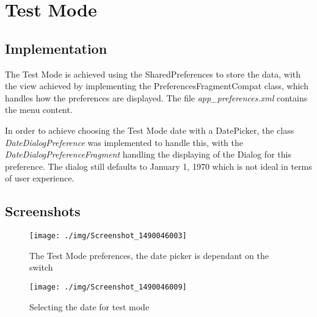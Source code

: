 \documentclass[report.tex]{subfiles}
\begin{document}
\section{Test Mode} %
\label{sec:test_mode}
\subsection{Implementation} %
\label{sub:implementation_3}
The Test Mode is achieved using the SharedPreferences to store the data, with
the view achieved by implementing the PreferencesFragmentCompat class, which
handles how the preferences are displayed. The file \emph{app\_preferences.xml}
contains the menu content.

In order to achieve choosing the Test Mode date with a DatePicker, the class
\emph{DateDialogPreference} was implemented to handle this, with the
\emph{DateDialogPreferenceFragment} handling the displaying of the Dialog for
this preference. The dialog still defaults to January 1, 1970 which is not ideal
in terms of user experience.

\subsection{Screenshots} %
\label{sub:screenshots_3}
\begin{figure}[H]
    \centering
    \texttt{[image: ./img/Screenshot\_1490046003]}
    \caption{The Test Mode preferences, the date picker is dependant on the
    switch}
\end{figure}

\begin{figure}[H]
    \centering
    \texttt{[image: ./img/Screenshot\_1490046009]}
    \caption{Selecting the date for test mode}
\end{figure}

\newpage
\end{document}
